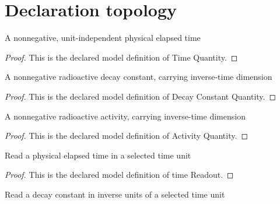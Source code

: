 \section{Declaration topology}
\begin{definition}
  \label{def:physics:phyx-mini-0576:phyxminiproblems-problemphyxmini0576-timequantity}
  A nonnegative, unit-independent physical elapsed time
\end{definition}
\begin{proof}
  This is the declared model definition of Time Quantity.
\end{proof}
\begin{definition}
  \label{def:physics:phyx-mini-0576:phyxminiproblems-problemphyxmini0576-decayconstantquantity}
  A nonnegative radioactive decay constant, carrying inverse-time dimension
\end{definition}
\begin{proof}
  This is the declared model definition of Decay Constant Quantity.
\end{proof}
\begin{definition}
  \label{def:physics:phyx-mini-0576:phyxminiproblems-problemphyxmini0576-activityquantity}
  A nonnegative radioactive activity, carrying inverse-time dimension
\end{definition}
\begin{proof}
  This is the declared model definition of Activity Quantity.
\end{proof}
\begin{definition}
  \label{def:physics:phyx-mini-0576:phyxminiproblems-problemphyxmini0576-timereadout}
  Read a physical elapsed time in a selected time unit
\end{definition}
\begin{proof}
  This is the declared model definition of time Readout.
\end{proof}
\begin{definition}
  \label{def:physics:phyx-mini-0576:phyxminiproblems-problemphyxmini0576-decayconstantreadout}
  Read a decay constant in inverse units of a selected time unit
\end{definition}
